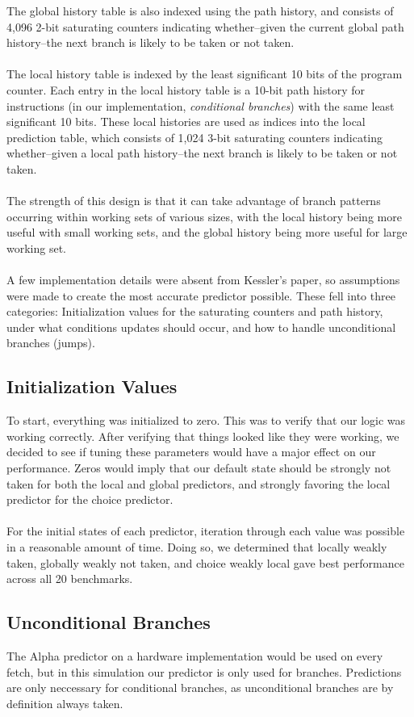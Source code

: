 \documentclass[twocolumn]{article}
\begin{document}
The global history table is also indexed using the path history, and consists of 4,096 2-bit saturating counters indicating whether--given the current global path history--the next branch is likely to be taken or not taken.\\\\
The local history table is indexed by the least significant 10 bits of the program counter.  Each entry in the local history table is a 10-bit path history for instructions (in our implementation, \textit{conditional branches}) with the same least significant 10 bits.  These local histories are used as indices into the local prediction table, which consists of 1,024 3-bit saturating counters indicating whether--given a local path history--the next branch is likely to be taken or not taken.\\\\
The strength of this design is that it can take advantage of branch patterns occurring within working sets of various sizes, with the local history being more useful with small working sets, and the global history being more useful for large working set.\\\\
A few implementation details were absent from Kessler's paper, so assumptions were made to create the most accurate predictor possible.  These fell into three categories:  Initialization values for the saturating counters and path history, under what conditions updates should occur, and how to handle unconditional branches (jumps).
\subsection{Initialization Values}
To start, everything was initialized to zero. This was to verify that our logic was working correctly. After verifying that things looked like they were working, we decided to see if tuning these parameters would have a major effect on our performance. Zeros would imply that our default state should be strongly not taken for both the local and global predictors, and strongly favoring the local predictor for the choice predictor.\\\\
For the initial states of each predictor, iteration through each value was possible in a reasonable amount of time. Doing so, we determined that locally weakly taken, globally weakly not taken, and choice weakly local gave best performance across all 20 benchmarks.
\subsection{Unconditional Branches}
The Alpha predictor on a hardware implementation would be used on every fetch, but in this simulation our predictor is only used for branches. Predictions are only neccessary for conditional branches, as unconditional branches are by definition always taken.
\end{document}
